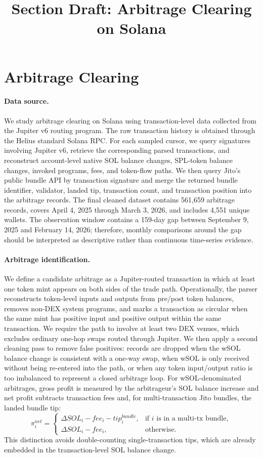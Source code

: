 \documentclass[11pt]{article}
\title{Section Draft: Arbitrage Clearing on Solana}
\author{}
\date{}
\begin{document}
\maketitle

\section{Arbitrage Clearing}

\paragraph{Data source.}
We study arbitrage clearing on Solana using transaction-level data collected from the Jupiter v6 routing program. The raw transaction history is obtained through the Helius standard Solana RPC. For each sampled cursor, we query signatures involving Jupiter v6, retrieve the corresponding parsed transactions, and reconstruct account-level native SOL balance changes, SPL-token balance changes, invoked programs, fees, and token-flow paths. We then query Jito's public bundle API by transaction signature and merge the returned bundle identifier, validator, landed tip, transaction count, and transaction position into the arbitrage records. The final cleaned dataset contains 561,659 arbitrage records, covers April 4, 2025 through March 3, 2026, and includes 4,551 unique wallets. The observation window contains a 159-day gap between September 9, 2025 and February 14, 2026; therefore, monthly comparisons around the gap should be interpreted as descriptive rather than continuous time-series evidence.

\paragraph{Arbitrage identification.}
We define a candidate arbitrage as a Jupiter-routed transaction in which at least one token mint appears on both sides of the trade path. Operationally, the parser reconstructs token-level inputs and outputs from pre/post token balances, removes non-DEX system programs, and marks a transaction as circular when the same mint has positive input and positive output within the same transaction. We require the path to involve at least two DEX venues, which excludes ordinary one-hop swaps routed through Jupiter. We then apply a second cleaning pass to remove false positives: records are dropped when the wSOL balance change is consistent with a one-way swap, when wSOL is only received without being re-entered into the path, or when any token input/output ratio is too imbalanced to represent a closed arbitrage loop. For wSOL-denominated arbitrages, gross profit is measured by the arbitrageur's SOL balance increase and net profit subtracts transaction fees and, for multi-transaction Jito bundles, the landed bundle tip:
\[
\pi^{net}_i =
\begin{cases}
\Delta SOL_i - fee_i - tip^{bundle}_i, & \text{if } i \text{ is in a multi-tx bundle},\\
\Delta SOL_i - fee_i, & \text{otherwise}.
\end{cases}
\]
This distinction avoids double-counting single-transaction tips, which are already embedded in the transaction-level SOL balance change.
\end{document}

